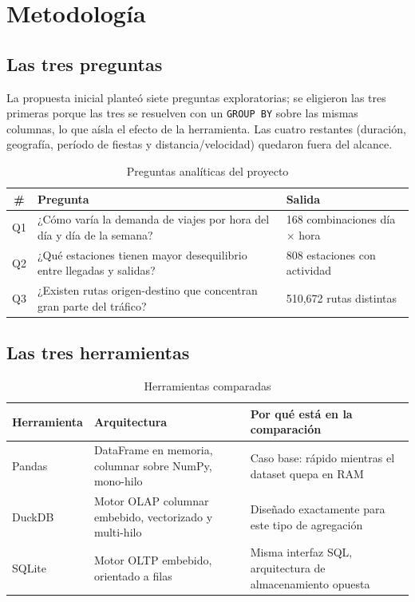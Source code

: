 \section{Metodología}

\subsection{Las tres preguntas}

La propuesta inicial planteó siete preguntas exploratorias; se eligieron las tres primeras porque las tres se resuelven con un \texttt{GROUP BY} sobre las mismas columnas, lo que aísla el efecto de la herramienta. Las cuatro restantes (duración, geografía, período de fiestas y distancia/velocidad) quedaron fuera del alcance.

\begin{table}[htbp]
\centering
\caption{Preguntas analíticas del proyecto}
\label{tab:preguntas}
\begin{tabularx}{\textwidth}{clX}
\toprule
\# & Pregunta & Salida \\
\midrule
Q1 & ¿Cómo varía la demanda de viajes por hora del día y día de la semana? & 168 combinaciones día $\times$ hora \\
Q2 & ¿Qué estaciones tienen mayor desequilibrio entre llegadas y salidas? & 808 estaciones con actividad \\
Q3 & ¿Existen rutas origen-destino que concentran gran parte del tráfico? & 510,672 rutas distintas \\
\bottomrule
\end{tabularx}
\end{table}

\subsection{Las tres herramientas}

\begin{table}[htbp]
\centering
\caption{Herramientas comparadas}
\label{tab:herramientas}
\begin{tabularx}{\textwidth}{lXX}
\toprule
Herramienta & Arquitectura & Por qué está en la comparación \\
\midrule
Pandas & DataFrame en memoria, columnar sobre NumPy, mono-hilo & Caso base: rápido mientras el dataset quepa en RAM \\
DuckDB & Motor OLAP columnar embebido, vectorizado y multi-hilo & Diseñado exactamente para este tipo de agregación \\
SQLite & Motor OLTP embebido, orientado a filas & Misma interfaz SQL, arquitectura de almacenamiento opuesta \\
\bottomrule
\end{tabularx}
\end{table}

